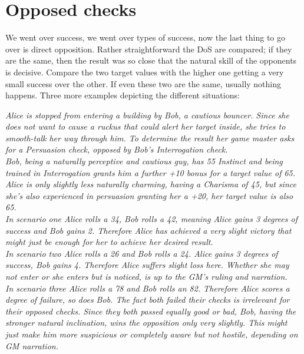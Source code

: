 \documentclass[12pt,a4paper,openany]{book}
\begin{document}
	\section{Opposed checks}
	We went over success, we went over types of success, now the last thing to go over is direct opposition. Rather straightforward the DoS are compared; if they are the same, then the result was so close that the natural skill of the opponents is decisive. Compare the two target values with the higher one getting a very small success over the other. If even these two are the same, usually nothing happens. Three more examples depicting the different situations:

	\begin{exampleblock}\textit{
	Alice is stopped from entering a building by Bob, a cautious bouncer. Since she does not want to cause a ruckus that could alert her target inside, she tries to smooth-talk her way through him. To determine the result her game master asks for a Persuasion check, opposed by Bob’s Interrogation check.\\
	Bob, being a naturally perceptive and cautious guy, has 55 Instinct and being trained in Interrogation grants him a further +10 bonus for a target value of 65. Alice is only slightly less naturally charming, having a Charisma of 45, but since she’s also experienced in persuasion granting her a +20, her target value is also 65.\\
	In scenario one Alice rolls a 34, Bob rolls a 42, meaning Alice gains 3 degrees of success and Bob gains 2. Therefore Alice has achieved a very slight victory that might just be enough for her to achieve her desired result.\\
	In scenario two Alice rolls a 26 and Bob rolls a 24. Alice gains 3 degrees of success, Bob gains 4. Therefore Alice suffers slight loss here. Whether she may not enter or she enters but is noticed, is up to the GM’s ruling and narration.\\
	In scenario three Alice rolls a 78 and Bob rolls an 82. Therefore Alice scores a degree of failure, so does Bob. The fact both failed their checks is irrelevant for their opposed checks. Since they both passed equally good or bad, Bob, having the stronger natural inclination, wins the opposition only very slightly. This might just make him more suspicious or completely aware but not hostile, depending on GM narration.\\
		}
	\end{exampleblock}
\end{document}
